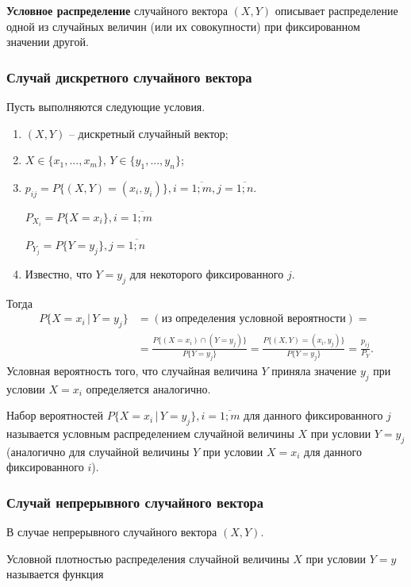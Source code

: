 \textbf{Условное распределение} случайного вектора $(X, Y)$ описывает распределение одной из случайных величин (или их совокупности) при фиксированном значении другой.

\subsubsection*{Случай дискретного случайного вектора}

Пусть выполняются следующие условия.

\begin{enumerate}
	
	\item $(X,Y)$ -- дискретный случайный вектор;
	\item $X \in \{x_1, ..., x_m\}$, $Y \in \{y_1, ..., y_n\}$;
	\item $p_{ij} = P\{(X,Y) = (x_i, y_i)\}, i = \overline{1; m}, j = \overline{1; n}$.
	
	$P_{X_i} = P\{X = x_i\}, i = \overline{1; m}$
	
	$P_{Y_j} = P\{Y = y_j\}, j = \overline{1; n}$
	
	\item Известно, что $Y = y_j$ для некоторого фиксированного $j$.
\end{enumerate}
Тогда 
\begin{align*}
	P\{X = x_i \,|\, Y = y_j\} &= 
	\left( \text{из определения условной вероятности} \right) = \\
	&= \frac{P\{(X = x_i) \cap (Y = y_j)\}}{P\{Y = y_j\}} = 
	\frac{P\{(X, Y) = (x_i, y_j)\}}{P\{Y = y_j\}} = 
	\frac{p_{ij}}{P_Y}.
\end{align*}
Условная вероятность того, что случайная величина $Y$ приняла значение $y_j$ при условии $X = x_i$ определяется аналогично.

Набор вероятностей $P\{X = x_i \,|\, Y = y_j\}, i = \overline{1; m}$ для данного фиксированного $j$ называется условным распределением случайной величины $X$ при условии $Y = y_j$ (аналогично для случайной величины $Y$ при условии $X = x_i$ для данного фиксированного $i$).

\subsubsection*{Случай непрерывного случайного вектора}

В случае непрерывного случайного вектора $(X, Y)$.

Условной плотностью распределения случайной величины $X$ при условии $Y = y$ называется функция

